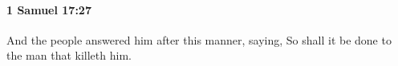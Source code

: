 
		\paragraph{1 Samuel 17:27} %
			\label{1SAMUEL-17-27}

			And the people answered him after this manner, saying, So shall it be done to the man that killeth him.


